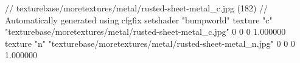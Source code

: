 // texturebase/moretextures/metal/rusted-sheet-metal_c.jpg (182)
// Automatically generated using cfgfix
setshader "bumpworld"
texture "c" "texturebase/moretextures/metal/rusted-sheet-metal_c.jpg" 0 0 0 1.000000
texture "n" "texturebase/moretextures/metal/rusted-sheet-metal_n.jpg" 0 0 0 1.000000
